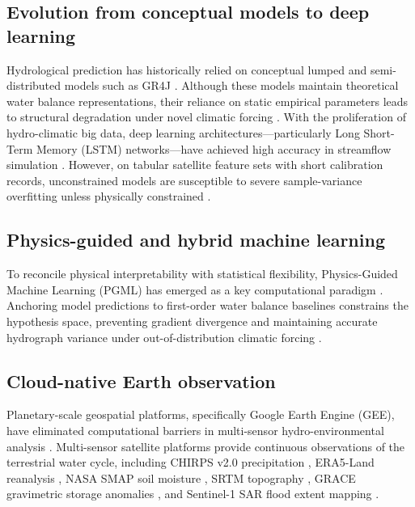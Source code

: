 \documentclass[11pt,a4paper,fleqn]{article}
\begin{document}
\subsection{Evolution from conceptual models to deep learning}
Hydrological prediction has historically relied on conceptual lumped and semi-distributed models such as GR4J \citep{perrin2003improvement}. Although these models maintain theoretical water balance representations, their reliance on static empirical parameters leads to structural degradation under novel climatic forcing \citep{frame2022post, gupta2009decomposition}. With the proliferation of hydro-climatic big data, deep learning architectures---particularly Long Short-Term Memory (LSTM) networks---have achieved high accuracy in streamflow simulation \citep{kratzert2018rainfall, kratzert2019towards, nearing2024global}. However, on tabular satellite feature sets with short calibration records, unconstrained models are susceptible to severe sample-variance overfitting unless physically constrained \citep{jia2021physics, willard2022integrating}.

\subsection{Physics-guided and hybrid machine learning}
To reconcile physical interpretability with statistical flexibility, Physics-Guided Machine Learning (PGML) has emerged as a key computational paradigm \citep{jia2021physics, karpatne2017physics, read2019process, willard2022integrating}. Anchoring model predictions to first-order water balance baselines constrains the hypothesis space, preventing gradient divergence and maintaining accurate hydrograph variance under out-of-distribution climatic forcing \citep{frame2022post}.

\subsection{Cloud-native Earth observation}
Planetary-scale geospatial platforms, specifically Google Earth Engine (GEE), have eliminated computational barriers in multi-sensor hydro-environmental analysis \citep{gorelick2017google}. Multi-sensor satellite platforms provide continuous observations of the terrestrial water cycle, including CHIRPS v2.0 precipitation \citep{funk2015climate}, ERA5-Land reanalysis \citep{munoz2021era5}, NASA SMAP soil moisture \citep{entekhabi2010soil}, SRTM topography \citep{farr2007shuttle}, GRACE gravimetric storage anomalies \citep{rodell2018emerging, tapley2019contributions}, and Sentinel-1 SAR flood extent mapping \citep{tian2023satellite}.
\end{document}
